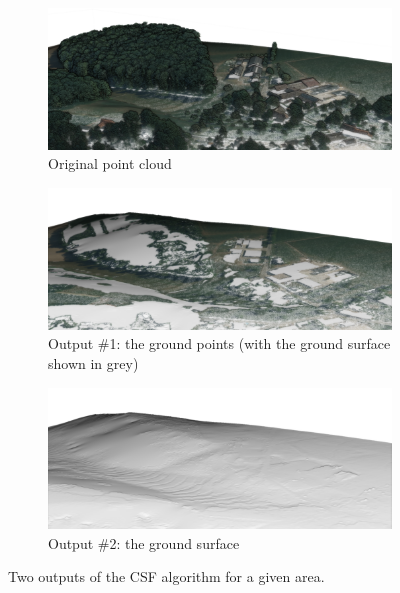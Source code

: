 \begin{figure}
  \centering
  \begin{subfigure}[b]{0.8\linewidth}
    \centering
    \includegraphics[width=\textwidth]{csf_before.png}
    \caption{Original point cloud}
  \end{subfigure}
  \begin{subfigure}[b]{0.8\linewidth}
    \centering
    \includegraphics[width=\textwidth]{csf_onlyground.png}
    \caption{Output \#1: the ground points (with the ground surface shown in grey)}
  \end{subfigure}
  \begin{subfigure}[b]{0.8\linewidth}
    \centering
    \includegraphics[width=\textwidth]{csf_after.png}
    \caption{Output \#2: the ground surface}
  \end{subfigure}
\caption{Two outputs of the CSF algorithm for a given area.}%
\label{fig:csf-example}
\end{figure}

